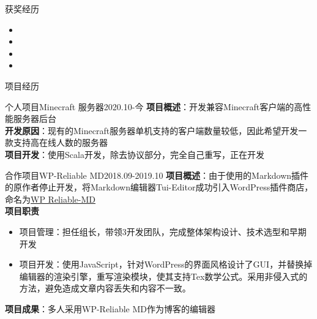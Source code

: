 \documentclass[UTF8]{resume}
\begin{document}
\begin{rSection}{获奖经历}
    \begin{itemize}
        \itemsep -0.5em \vspace{-0.5em}
        \item{}
        \item{}
        \item{}  
        \item{}
    \end{itemize}
\end{rSection}

\begin{rSection}{项目经历}
    \begin{rProject}{个人项目}{Minecraft 服务器}{2020.10-今}
        \textbf{项目概述}：开发兼容Minecraft客户端的高性能服务器后台\\
        \textbf{开发原因}：现有的Minecraft服务器单机支持的客户端数量较低，因此希望开发一款支持高在线人数的服务器\\
        \textbf{项目开发}：使用Scala开发，除去协议部分，完全自己重写，正在开发
    \end{rProject}

    \begin{rProject}{合作项目}{WP-Reliable MD}{2018.09-2019.10}
        \textbf{项目概述}：由于使用的Markdown插件的原作者停止开发，将Markdown编辑器Tui-Editor成功引入WordPress插件商店，命名为\href{https://github.com/jackworkshop/WP-ReliableMD}{WP Reliable-MD}\\
        \textbf{项目职责}
        \begin{itemize}
            \itemsep -0.5em \vspace{-0.5em}
            \item 项目管理：担任组长，带领3开发团队，完成整体架构设计、技术选型和早期开发
            \item 项目开发：使用JavaScript，针对WordPress的界面风格设计了GUI，并替换掉编辑器的渲染引擎，重写渲染模块，使其支持Tex数学公式。采用非侵入式的方法，避免造成文章内容丢失和内容不一致。
        \end{itemize}
        \textbf{项目成果}：多人采用WP-Reliable MD作为博客的编辑器
    \end{rProject}



\end{rSection}
\end{document}
